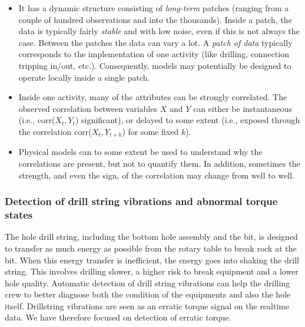 \begin{itemize}

\item It has a dynamic structure consisting of \emph{long-term} patches (ranging from a couple of hundred observations and into the thousands). Inside a patch, the data is typically fairly \emph{stable} and with low noise, even if this is not always the case. Between the patches the data can vary a lot. A \emph{patch of data} typically corresponds to the implementation of one activity (like drilling, connection tripping in/out, etc.). 
Consequently, models may potentially be designed to operate locally inside a single patch.

\item Inside one activity, many of the attributes can be strongly correlated. The observed correlation between variables $X$ and $Y$ can either be instantaneous (i.e., corr($X_t, Y_t$) significant), or delayed to some extent (i.e., exposed through the correlation corr($X_t, Y_{t+k}$) for some fixed $k$).

\item Physical models can to some extent be used to understand why the correlations are present, but not to quantify them. In addition, sometimes the strength, and even the sign, of the correlation may change from well to well.

\end{itemize}



\subsubsection{Detection of drill string vibrations and abnormal torque states}\label{SubSection:DetectionTorque}

The hole drill string, including the bottom hole assembly and the bit, is designed to transfer as much energy as possible from the rotary table to break rock at the bit.  When this energy transfer is inefficient, the energy goes into shaking the drill string.  This involves drilling slower, a higher risk to break equipment and a lower hole quality. Automatic detection of drill string vibrations can help the drilling crew to better diagnose both the condition of the equipments and also the hole itself.  Drillstring vibrations are seen as an erratic torque signal on the realtime data.  We have therefore focused on detection of erratic torque.

